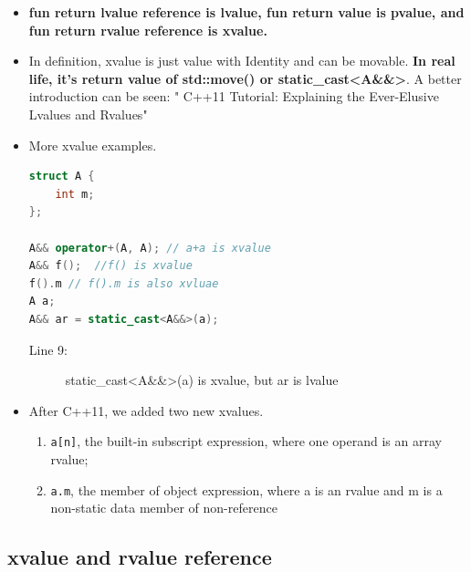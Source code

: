 \documentclass[a4paper,11pt,twoside]{book}
\begin{document}
\begin{itemize}
	\item \textbf{fun return lvalue reference is lvalue, fun return value is pvalue, and fun return rvalue reference is xvalue.}
	
	\item In definition,  xvalue is just value with Identity and can be movable. \textbf{In real life, it's  return value of std::move() or static\_cast<A\&\&>}. A better introduction can be seen: " C++11 Tutorial: Explaining the Ever-Elusive Lvalues and Rvalues"
	
	\item More xvalue examples.
\begin{lstlisting}[frame=single, language=c++, mathescape=true]
struct A {
	int m;
};
	
A&& operator+(A, A); // a+a is xvalue
A&& f();  //f() is xvalue
f().m // f().m is also xvluae
A a;
A&& ar = static_cast<A&&>(a);
\end{lstlisting}
\begin{description}
	\item[Line 9:] static\_cast<A\&\&>(a) is xvalue, but ar is lvalue
\end{description}
	
	\item After C++11, we added two new xvalues.
	\begin{enumerate}
		\item \texttt{a[n]}, the built-in subscript expression, where one operand is an array rvalue;
		\item \texttt{a.m}, the member of object expression, where a is an rvalue and m is a non-static data member of non-reference
	\end{enumerate}
\end{itemize}

\subsection{xvalue and rvalue reference}
\end{document}

